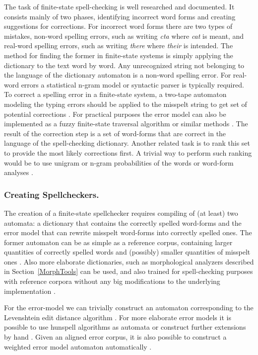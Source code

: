 \documentclass{llncs}
\begin{document}
The task of finite-state spell-checking is well researched and documented. It
consists mainly of two phases, identifying incorrect word forms and creating
suggestions for corrections. For incorrect word forms there are two types of
mistakes, non-word spelling errors, such as writing \emph{cta} where \emph{cat}
is meant, and real-word spelling errors, such as writing \emph{there} where
\emph{their} is intended. The method for finding the former in finite-state systems
is simply applying the dictionary to the text word by word. Any unrecognized
string not belonging to the language of the dictionary automaton is a non-word
spelling error. For real-word errors a statistical n-gram model or syntactic
parser is typically required. To correct a spelling error in a finite-state
system, a two-tape automaton modeling the typing errors should be applied to
the misspelt string to get set of potential corrections \cite{pirinen/2010/lrec}.
For practical purposes the error model can also be implemented as a
fuzzy finite-state traversal algorithm or similar methods \cite{oflazer/1996}. The result
of the correction step is a set of word-forms that are correct in the
language of the spell-checking dictionary. Another related task is to rank this
set to provide the most likely corrections first.
A trivial way to perform such ranking would be to use
unigram \cite{pirinen/2010/lrec} or n-gram probabilities of the words 
\cite{mays/1991} or word-form analyses \cite{pirinen/2012/cicling}.

\subsubsection{Creating Spellcheckers.}

The creation of a finite-state spellchecker requires compiling of (at least) two
automata: a dictionary that contains the correctly spelled word-forms and the
error model that can rewrite misspelt word-forms into correctly spelled ones.
The former automaton can be as simple as a reference corpus, containing larger
quantities of correctly spelled words and (possibly) smaller quantities of
misspelt ones \cite{norvig/2010}. Also more elaborate dictionaries, such as
morphological analyzers described in Section~\ref{MorphTools} can be used, and also
trained for spell-checking purposes with reference corpora without any big
modifications to the underlying implementation \cite{pirinen/2010/lrec}.

For the error-model we can trivially construct an automaton corresponding to
the Levenshtein edit distance algorithm \cite{oflazer/1996,agata/2002}. For more elaborate error models
it is possible to use hunspell algorithms as automata \cite{pirinen/2010/il} or
construct further extensions by hand \cite{pirinen/2010/lrec}. Given an
aligned error corpus, it is also possible to construct a weighted error model
automaton automatically \cite{brill/2000}.
\end{document}
